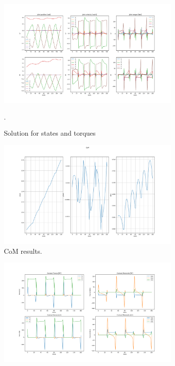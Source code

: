 \begin{figure}[h!]
\centering
\begin{subfigure}{.5\textwidth}
  \centering
  \includegraphics[width=1\linewidth]{Media/Crocoddyl/RH5Legs/FixedPeriodicity/RH5PeriodicGait_Solution.png}
  \caption{Solution for states and torques}.
\end{subfigure}
\begin{subfigure}{.5\textwidth}
  \centering
  \includegraphics[width=1\linewidth]{Media/Crocoddyl/RH5Legs/FixedPeriodicity/RH5PeriodicGait_CoM.png}
\caption{CoM results.}
\end{subfigure}
\begin{subfigure}{.5\textwidth}
  \centering
\includegraphics[width=1\linewidth]{Media/Crocoddyl/RH5Legs/FixedPeriodicity/RH5PeriodicGait_ContactWrenches.png}

\end{subfigure}
\end{figure}
